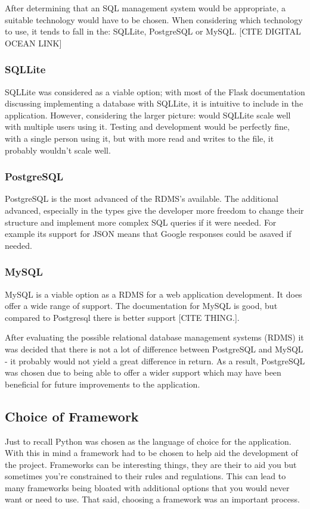 After determining that an SQL management system would be appropriate, a suitable technology would have to be chosen. When considering which technology to use, it tends to fall in the: SQLLite, PostgreSQL or MySQL.
[CITE DIGITAL OCEAN LINK]
\subsubsection{SQLLite}
SQLLite was considered as a viable option; with most of the Flask documentation discussing implementing a database with SQLLite, it is intuitive to include in the application. However, considering the larger picture: would SQLLite scale well with multiple users using it. Testing and development would be perfectly fine, with a single person using it, but with more read and writes to the file, it probably wouldn't scale well.

\subsubsection{PostgreSQL}
PostgreSQL is the most advanced of the RDMS's available. The additional advanced, especially in the types give the developer more freedom to change their structure and implement more complex SQL queries if it were needed. For example its support for JSON means that Google responses could be asaved if needed.
\subsubsection{MySQL}
MySQL is a viable option as a RDMS for a web application development. It does offer a wide range of support. The documentation for MySQL is good, but compared to Postgresql there is better support [CITE THING.].


\begin{flushleft}
After evaluating the possible relational database management systems (RDMS) it was decided that there is not a lot of difference between PostgreSQL and MySQL - it probably would not yield a great difference in return. As a result, PostgreSQL was chosen due to being able to offer a wider support which may have been beneficial for future improvements to the application.
\end{flushleft}

\subsection{Choice of Framework}

Just to recall Python was chosen as the language of choice for the application. With this in mind a framework had to be chosen to help aid the development of the project. Frameworks can be interesting things, they are their to aid you but sometimes you're constrained to their rules and regulations. This can lead to many frameworks being bloated with additional options that you would never want or need to use. That said, choosing a framework was an important process.

